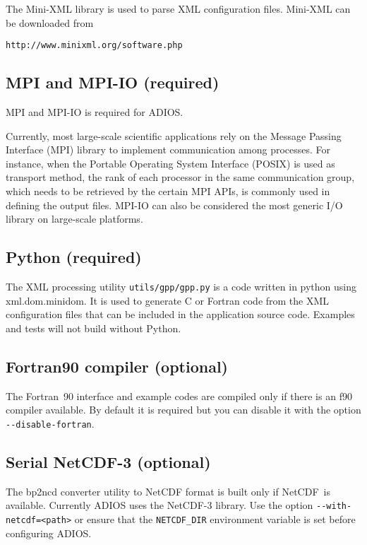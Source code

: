 The Mini-XML library is used to parse XML configuration files. Mini-XML can be 
downloaded from 

\begin{lstlisting}[language={}]
http://www.minixml.org/software.php
\end{lstlisting}


\subsection{MPI and MPI-IO (required)}

MPI and MPI-IO is required for ADIOS.

Currently, most large-scale scientific applications rely on the Message Passing 
Interface (MPI) library to implement communication among processes. For instance, 
when the Portable Operating System Interface (POSIX) is used as transport method, 
the rank of each processor in the same communication group, which needs to be retrieved 
by the certain MPI APIs, is commonly used in defining the output files. MPI-IO 
can also be considered the most generic I/O library on large-scale platforms. 

\subsection{Python (required)}

The XML processing utility \verb+utils/gpp/gpp.py+ is a code written in python using xml.dom.minidom. 
It is used to generate C or Fortran code from the XML configuration files that 
can be included in the application source code.  Examples and tests will not build 
without Python. 

\subsection{Fortran90 compiler (optional)}

The Fortran~90 interface and example codes are compiled only if there is an f90 
compiler available. By default it is required but you can disable it with the option 
\verb+--disable-fortran+.

\subsection{Serial NetCDF-3 (optional)}

The bp2ncd converter utility to NetCDF format is built only if NetCDF~is available. 
 Currently ADIOS uses the NetCDF-3 library. Use the option \verb+--with-netcdf=<path>+ 
or ensure that the \verb+NETCDF_DIR+ environment variable is set before configuring ADIOS.

